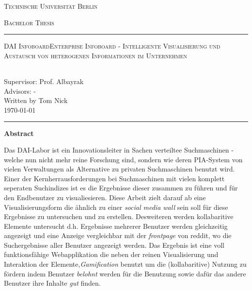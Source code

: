 \documentclass[12pt,twoside]{book}
\renewcommand{\title}{DAI Infoboard}
\renewcommand{\author}{Tom Nick}
\begin{document}
\begin{titlepage}
\begin{center}
{\Huge \textsc{Technische Universität Berlin}}
{\fontsize{2.5cm}{2cm}\selectfont \textsc{Bachelor Thesis}\par}
\vspace{1cm}
\hrule
\vspace{0.3cm}
{\Huge \textsc{\title{Enterprise Infoboard - Intelligente Visualisierung und Austausch von heterogenen Informationen im Unternehmen}}\par}
~\\[0.1cm]
{\Large Supervisor: Prof. Albayrak}\\[0.1cm]
{\Large Advisors: -}\\[0.3cm]
{\Large Written by \author{}}\\[0.1cm]
{\Large \today}
\vspace{0.55cm}
\hrule
\end{center}
\vfill
\begin{center}{\Large\textbf{Abstract}}\end{center}

Das DAI-Labor ist ein Innovationsleiter in Sachen verteiltee Suchmaschinen - welche nun nicht mehr reine Forschung sind, sondern wie deren PIA-System von vielen Verwaltungen als Alternative zu privaten Suchmaschinen benutzt wird. Einer der Kernherrausforderungen bei Suchmaschinen mit vielen komplett seperaten Suchindizes ist es die Ergebnisse dieser zusammen zu führen und für den Endbenutzer zu visualiesieren. Diese Arbeit zielt darauf ab eine Visualisierungsform die ähnlich zu einer \textit{social media wall} sein soll für diese Ergebnisse zu untersuchen und zu erstellen. Desweiteren werden kollabaritive Elemente untersucht d.h. Ergebnisse mehrerer Benutzer werden gleichzeitig angezeigt und eine Anzeige vergleichbar mit der \textit{frontpage} von reddit, wo die Suchergebnisse aller Benutzer angezeigt werden. Das Ergebnis ist eine voll funktionsfähige Webapplikation die neben der reinen Visualisierung und Interaktion der Elemente,\textit{Gamification} benutzt um die (kollabaritive) Nutzung zu fördern indem Benutzer \textit{belohnt} werden für die Benutzung sowie dafür das andere Benutzer ihre Inhalte \textit{gut} finden.

\end{titlepage}
\end{document}
